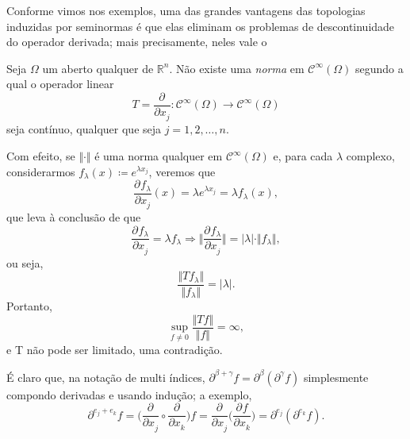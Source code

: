 \documentclass[../distribution_theory_notes.tex]{subfiles}
\begin{document}
Conforme vimos nos exemplos, uma das grandes vantagens das topologias induzidas por seminormas é que elas eliminam os problemas de descontinuidade do operador derivada; mais precisamente, neles vale o
\begin{theorem*}
	Seja \(\Omega \) um aberto qualquer de \(\mathbb{R}^{n}\). Não existe uma \textit{norma} em \(\mathcal{C}^{\infty}(\Omega )\) segundo a qual o operador linear
	\[
		T=\frac{\partial^{}}{\partial x_{j}^{}}:\mathcal{C}^{\infty}(\Omega )\rightarrow \mathcal{C}^{\infty}(\Omega )
	\]
	seja contínuo, qualquer que seja \(j=1,2,\dotsc ,n.\)
\end{theorem*}
\begin{proof*}
	Com efeito, se \(\Vert \cdot  \Vert\) é uma norma qualquer em \(\mathcal{C}^{\infty}(\Omega )\) e, para cada \(\lambda \) complexo, considerarmos \(f_{\lambda }(x)\coloneqq e^{\lambda x_{j}}\), veremos que
	\[
		\frac{\partial^{}f_{\lambda }}{\partial x_{j}^{}}(x)=\lambda e^{\lambda x_{j}}=\lambda f_{\lambda }(x),
	\]
	que leva à conclusão de que
	\[
		\frac{\partial^{}f_{\lambda }}{\partial x_{j}^{}} = \lambda f_{\lambda } \Rightarrow \biggl\Vert \frac{\partial^{}f_{\lambda }}{\partial x_{j}^{}} \biggr\Vert=|\lambda |\cdot \Vert f_{\lambda } \Vert,
	\]
	ou seja,
	\[
		\frac{\Vert Tf_{\lambda } \Vert}{\Vert f_{\lambda } \Vert}=|\lambda |.
	\]
	Portanto,
	\[
		\sup_{f\neq 0}\frac{\Vert Tf \Vert}{\Vert f \Vert}=\infty,
	\]
	e T não pode ser limitado, uma contradição. \qedsymbol
\end{proof*}
\begin{tcolorbox}[
		skin=enhanced,
		title=Observação,
		fonttitle=\bfseries,
		colframe=black,
		colbacktitle=cyan!75!white,
		colback=cyan!15,
		colbacklower=black,
		coltitle=black,
		drop fuzzy shadow,
	]
	É claro que, na notação de multi índices, \(\partial^{\beta +\gamma }f=\partial^{\beta }(\partial^{\gamma }f)\) simplesmente compondo derivadas e usando indução; a exemplo,
	\[
		\partial^{e_{j}+e_{k}}f = \biggl(\frac{\partial^{}}{\partial x_{j}^{}}\circ \frac{\partial^{}}{\partial x_{k}^{}}\biggr)f = \frac{\partial^{}}{\partial x_{j}^{}}\biggl(\frac{\partial^{}f}{\partial x_{k}^{}}\biggr) = \partial^{e_{j}}(\partial^{e_{k}}f).
	\]
\end{tcolorbox}
\end{document}
